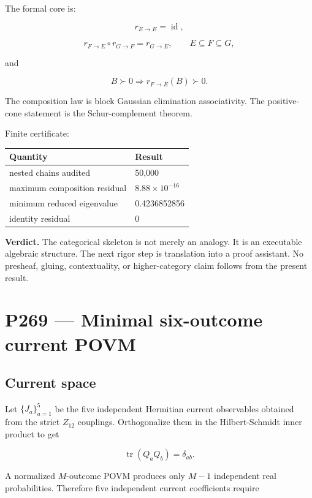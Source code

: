 \documentclass[11pt,a4paper,openany]{report}
\begin{document}
The formal core is:

\[
r_{E\to E}=\operatorname{id},
\]

\[
r_{F\to E}\circ r_{G\to F}=r_{G\to E},
\qquad E\subseteq F\subseteq G,
\]

and

\[
B\succ0\Longrightarrow r_{F\to E}(B)\succ0.
\]

The composition law is block Gaussian elimination associativity. The positive-cone statement is the Schur-complement theorem.

Finite certificate:

\begin{center}
\begingroup\small
\setlength{\tabcolsep}{2.5pt}
\renewcommand{\arraystretch}{1.16}
\begin{longtable}{@{}p{}p{}@{}}
\toprule
\textbf{Quantity} & \textbf{Result} \\
\midrule
\endhead
nested chains audited & 50,000 \\
maximum composition residual & \(8.88\times10^{-16}\) \\
minimum reduced eigenvalue & 0.4236852856 \\
identity residual & 0 \\
\bottomrule
\end{longtable}
\endgroup
\end{center}

\textbf{Verdict.} The categorical skeleton is not merely an analogy. It is an executable algebraic structure. The next rigor step is translation into a proof assistant. No presheaf, gluing, contextuality, or higher-category claim follows from the present result.

\chapter{P269 --- Minimal six-outcome current POVM}

\section{Current space}

Let \(\{J_a\}_{a=1}^{5}\) be the five independent Hermitian current observables obtained from the strict \(Z_{12}\) couplings. Orthogonalize them in the Hilbert-Schmidt inner product to get

\[
\operatorname{tr}(Q_aQ_b)=\delta_{ab}.
\]

A normalized \(M\)-outcome POVM produces only \(M-1\) independent real probabilities. Therefore five independent current coefficients require
\end{document}
